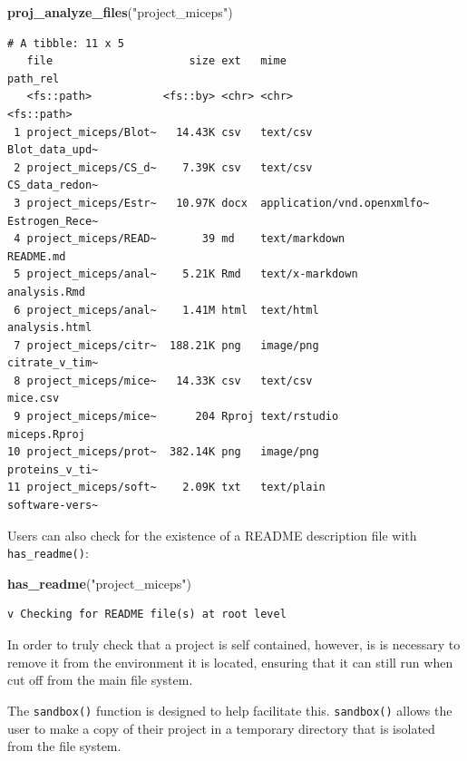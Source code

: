 \documentclass[12pt,twoside]{reedthesis}
\newenvironment{Shaded}{\begin{snugshade}}{\end{snugshade}}
\newcommand{\KeywordTok}[1]{\textcolor[rgb]{0.13,0.29,0.53}{\textbf{#1}}}
\newcommand{\StringTok}[1]{\textcolor[rgb]{0.31,0.60,0.02}{#1}}
\newcommand{\NormalTok}[1]{#1}
\begin{document}
\footnotesize
\begin{Shaded}
\begin{Highlighting}[]
\KeywordTok{proj_analyze_files}\NormalTok{(}\StringTok{"project_miceps"}\NormalTok{)}
\end{Highlighting}
\end{Shaded}
\begin{verbatim}
# A tibble: 11 x 5
   file                     size ext   mime                       path_rel      
   <fs::path>           <fs::by> <chr> <chr>                      <fs::path>    
 1 project_miceps/Blot~   14.43K csv   text/csv                   Blot_data_upd~
 2 project_miceps/CS_d~    7.39K csv   text/csv                   CS_data_redon~
 3 project_miceps/Estr~   10.97K docx  application/vnd.openxmlfo~ Estrogen_Rece~
 4 project_miceps/READ~       39 md    text/markdown              README.md     
 5 project_miceps/anal~    5.21K Rmd   text/x-markdown            analysis.Rmd  
 6 project_miceps/anal~    1.41M html  text/html                  analysis.html 
 7 project_miceps/citr~  188.21K png   image/png                  citrate_v_tim~
 8 project_miceps/mice~   14.33K csv   text/csv                   mice.csv      
 9 project_miceps/mice~      204 Rproj text/rstudio               miceps.Rproj  
10 project_miceps/prot~  382.14K png   image/png                  proteins_v_ti~
11 project_miceps/soft~    2.09K txt   text/plain                 software-vers~
\end{verbatim}
\normalsize

Users can also check for the existence of a README description file with
\texttt{has\_readme()}:

\footnotesize
\begin{Shaded}
\begin{Highlighting}[]
\KeywordTok{has_readme}\NormalTok{(}\StringTok{"project_miceps"}\NormalTok{)}
\end{Highlighting}
\end{Shaded}
\begin{verbatim}
v Checking for README file(s) at root level
\end{verbatim}
\normalsize

In order to truly check that a project is self contained, however, is is
necessary to remove it from the environment it is located, ensuring that
it can still run when cut off from the main file system.

The \texttt{sandbox()} function is designed to help facilitate this.
\texttt{sandbox()} allows the user to make a copy of their project in a
temporary directory that is isolated from the file system.
\end{document}

